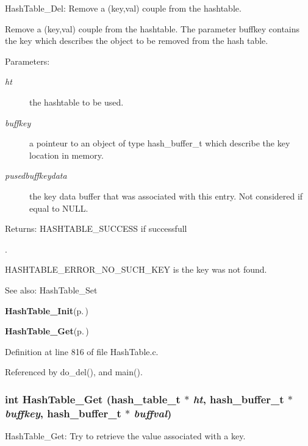 Hash\-Table\_\-Del: Remove a (key,val) couple from the hashtable.

Remove a (key,val) couple from the hashtable. The parameter buffkey contains the key which describes the object to be removed from the hash table.

\begin{Desc}
\item[Parameters:]
\begin{description}
\item[{\em ht}]the hashtable to be used. \item[{\em buffkey}]a pointeur to an object of type hash\_\-buffer\_\-t which describe the key location in memory. \item[{\em pusedbuffkeydata}]the key data buffer that was associated with this entry. Not considered if equal to NULL.\end{description}
\end{Desc}
\begin{Desc}
\item[Returns:]HASHTABLE\_\-SUCCESS if successfull\par
. 

HASHTABLE\_\-ERROR\_\-NO\_\-SUCH\_\-KEY is the key was not found.\end{Desc}
\begin{Desc}
\item[See also:]Hash\-Table\_\-Set 

{\bf Hash\-Table\_\-Init}{\rm (p.\,\pageref{group__HashTableExportedFunctions_ga0})} 

{\bf Hash\-Table\_\-Get}{\rm (p.\,\pageref{group__HashTableExportedFunctions_ga2})} \end{Desc}


Definition at line 816 of file Hash\-Table.c.

Referenced by do\_\-del(), and main().
\subsubsection{\setlength{\rightskip}{0pt plus 5cm}int Hash\-Table\_\-Get (hash\_\-table\_\-t $\ast$ {\em ht}, hash\_\-buffer\_\-t $\ast$ {\em buffkey}, hash\_\-buffer\_\-t $\ast$ {\em buffval})}\label{group__HashTableExportedFunctions_ga2}


Hash\-Table\_\-Get: Try to retrieve the value associated with a key.

